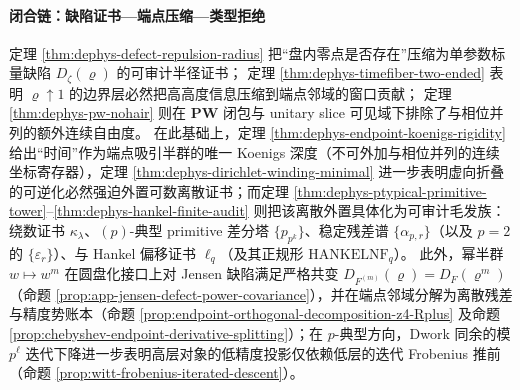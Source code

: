 \paragraph{闭合链：缺陷证书—端点压缩—类型拒绝}
定理 \ref{thm:dephys-defect-repulsion-radius} 把“盘内零点是否存在”压缩为单参数标量缺陷 \(D_{\zeta}(\varrho)\) 的可审计半径证书；
定理 \ref{thm:dephys-timefiber-two-ended} 表明 \(\varrho\uparrow 1\) 的边界层必然把高高度信息压缩到端点邻域的窗口贡献；
定理 \ref{thm:dephys-pw-nohair} 则在 \(\mathbf{PW}\) 闭包与 unitary slice 可见域下排除了与相位并列的额外连续自由度。
在此基础上，定理 \ref{thm:dephys-endpoint-koenigs-rigidity} 给出“时间”作为端点吸引半群的唯一 Koenigs 深度（不可外加与相位并列的连续坐标寄存器），定理 \ref{thm:dephys-dirichlet-winding-minimal} 进一步表明虚向折叠的可逆化必然强迫外置可数离散证书；而定理 \ref{thm:dephys-ptypical-primitive-tower}--\ref{thm:dephys-hankel-finite-audit} 则把该离散外置具体化为可审计毛发族：绕数证书 \(\kappa_{\lambda}\)、\((p)\)-典型 primitive 差分塔 \(\{p_{p^k}\}\)、稳定残差谱 \(\{\alpha_{p,r}\}\)（以及 \(p=2\) 的 \(\{\varepsilon_r\}\)）、与 Hankel 偏移证书 \(\ell_q\)（及其正规形 \(\mathrm{HANKELNF}_q\)）。
此外，幂半群 \(w\mapsto w^m\) 在圆盘化接口上对 Jensen 缺陷满足严格共变 \(D_{F^{(m)}}(\varrho)=D_F(\varrho^m)\)（命题 \ref{prop:app-jensen-defect-power-covariance}），并在端点邻域分解为离散残差与精度势账本（命题 \ref{prop:endpoint-orthogonal-decomposition-z4-Rplus} 及命题 \ref{prop:chebyshev-endpoint-derivative-splitting}）；在 \(p\)-典型方向，Dwork 同余的模 \(p^\ell\) 迭代下降进一步表明高层对象的低精度投影仅依赖低层的迭代 Frobenius 推前（命题 \ref{prop:witt-frobenius-iterated-descent}）。

